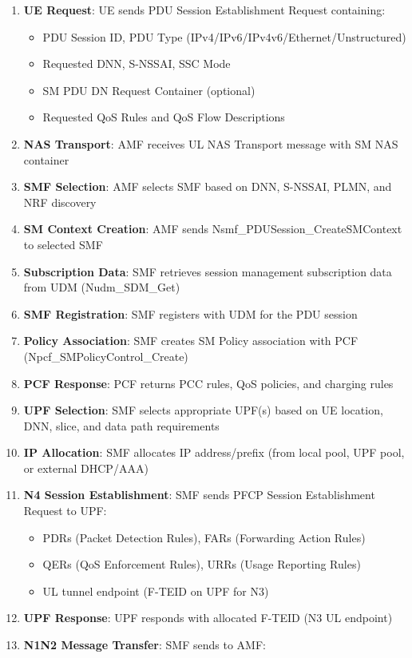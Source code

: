\begin{enumerate}
\def\labelenumi{\arabic{enumi}.}
\tightlist
\item
  \textbf{UE Request}: UE sends PDU Session Establishment Request containing:

  \begin{itemize}
  \tightlist
  \item
    PDU Session ID, PDU Type (IPv4/\allowbreak{}IPv6/\allowbreak{}IPv4v6/\allowbreak{}Ethernet/\allowbreak{}Unstructured)
  \item
    Requested DNN, S-NSSAI, SSC Mode
  \item
    SM PDU DN Request Container (optional)
  \item
    Requested QoS Rules and QoS Flow Descriptions
  \end{itemize}
\item
  \textbf{NAS Transport}: AMF receives UL NAS Transport message with SM NAS container
\item
  \textbf{SMF Selection}: AMF selects SMF based on DNN, S-NSSAI, PLMN, and NRF discovery
\item
  \textbf{SM Context Creation}: AMF sends Nsmf\_\allowbreak{}PDUSession\_\allowbreak{}CreateSMContext to selected SMF
\item
  \textbf{Subscription Data}: SMF retrieves session management subscription data from UDM (Nudm\_\allowbreak{}SDM\_\allowbreak{}Get)
\item
  \textbf{SMF Registration}: SMF registers with UDM for the PDU session
\item
  \textbf{Policy Association}: SMF creates SM Policy association with PCF (Npcf\_\allowbreak{}SMPolicyControl\_\allowbreak{}Create)
\item
  \textbf{PCF Response}: PCF returns PCC rules, QoS policies, and charging rules
\item
  \textbf{UPF Selection}: SMF selects appropriate UPF(s) based on UE location, DNN, slice, and data path requirements
\item
  \textbf{IP Allocation}: SMF allocates IP address/\allowbreak{}prefix (from local pool, UPF pool, or external DHCP/\allowbreak{}AAA)
\item
  \textbf{N4 Session Establishment}: SMF sends PFCP Session Establishment Request to UPF:

  \begin{itemize}
  \tightlist
  \item
    PDRs (Packet Detection Rules), FARs (Forwarding Action Rules)
  \item
    QERs (QoS Enforcement Rules), URRs (Usage Reporting Rules)
  \item
    UL tunnel endpoint (F-TEID on UPF for N3)
  \end{itemize}
\item
  \textbf{UPF Response}: UPF responds with allocated F-TEID (N3 UL endpoint)
\item
  \textbf{N1N2 Message Transfer}: SMF sends to AMF:


\end{enumerate}
